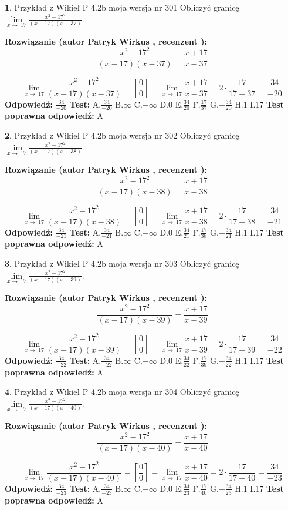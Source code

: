 \documentclass[12pt, a4paper]{article}
\theoremstyle{definition} %
\newtheorem{zad}{}
\newcommand{\zadStart}[1]{\begin{zad}#1\newline}
\newcommand{\zadStop}{\end{zad}}
\newcommand{\rozwStart}[2]{\noindent \textbf{Rozwiązanie (autor #1 , recenzent #2): }\newline}
\newcommand{\rozwStop}{\newline}
\newcommand{\odpStart}{\noindent \textbf{Odpowiedź:}\newline}
\newcommand{\odpStop}{\newline}
\newcommand{\testStart}{\noindent \textbf{Test:}\newline}
\newcommand{\testStop}{\newline}
\newcommand{\kluczStart}{\noindent \textbf{Test poprawna odpowiedź:}\newline}
\newcommand{\kluczStop}{\newline}
\begin{document}
\zadStart{Przykład z Wikieł P 4.2b moja wersja nr 301}
Obliczyć granicę $\lim\limits_{x\to\ 17}\frac{x^{2}-17^{2}}{(x-17)(x-37)}$.
\zadStop
\rozwStart{Patryk Wirkus}{}
$$\frac{x^{2}-17^{2}}{(x-17)(x-37)}=\frac{x+17}{x-37}$$

$$\lim\limits_{x\to\ 17}\frac{x^{2}-17^{2}}{(x-17)(x-37)}=[\frac{0}{0}]=\lim\limits_{x\to\ 17}\frac{x+17}{x-37}=2 \cdot \frac{17}{17-37} = \frac{34}{-20}$$
\rozwStop
\odpStart
$\frac{34}{-20}$
\odpStop
\testStart
A.$\frac{34}{-20}$
B.$\infty$
C.$-\infty$
D.$0$
E.$\frac{34}{20}$
F.$\frac{17}{37}$
G.$-\frac{34}{20}$
H.$1$
I.$17$
\testStop
\kluczStart
A
\kluczStop



\zadStart{Przykład z Wikieł P 4.2b moja wersja nr 302}
Obliczyć granicę $\lim\limits_{x\to\ 17}\frac{x^{2}-17^{2}}{(x-17)(x-38)}$.
\zadStop
\rozwStart{Patryk Wirkus}{}
$$\frac{x^{2}-17^{2}}{(x-17)(x-38)}=\frac{x+17}{x-38}$$

$$\lim\limits_{x\to\ 17}\frac{x^{2}-17^{2}}{(x-17)(x-38)}=[\frac{0}{0}]=\lim\limits_{x\to\ 17}\frac{x+17}{x-38}=2 \cdot \frac{17}{17-38} = \frac{34}{-21}$$
\rozwStop
\odpStart
$\frac{34}{-21}$
\odpStop
\testStart
A.$\frac{34}{-21}$
B.$\infty$
C.$-\infty$
D.$0$
E.$\frac{34}{21}$
F.$\frac{17}{38}$
G.$-\frac{34}{21}$
H.$1$
I.$17$
\testStop
\kluczStart
A
\kluczStop



\zadStart{Przykład z Wikieł P 4.2b moja wersja nr 303}
Obliczyć granicę $\lim\limits_{x\to\ 17}\frac{x^{2}-17^{2}}{(x-17)(x-39)}$.
\zadStop
\rozwStart{Patryk Wirkus}{}
$$\frac{x^{2}-17^{2}}{(x-17)(x-39)}=\frac{x+17}{x-39}$$

$$\lim\limits_{x\to\ 17}\frac{x^{2}-17^{2}}{(x-17)(x-39)}=[\frac{0}{0}]=\lim\limits_{x\to\ 17}\frac{x+17}{x-39}=2 \cdot \frac{17}{17-39} = \frac{34}{-22}$$
\rozwStop
\odpStart
$\frac{34}{-22}$
\odpStop
\testStart
A.$\frac{34}{-22}$
B.$\infty$
C.$-\infty$
D.$0$
E.$\frac{34}{22}$
F.$\frac{17}{39}$
G.$-\frac{34}{22}$
H.$1$
I.$17$
\testStop
\kluczStart
A
\kluczStop



\zadStart{Przykład z Wikieł P 4.2b moja wersja nr 304}
Obliczyć granicę $\lim\limits_{x\to\ 17}\frac{x^{2}-17^{2}}{(x-17)(x-40)}$.
\zadStop
\rozwStart{Patryk Wirkus}{}
$$\frac{x^{2}-17^{2}}{(x-17)(x-40)}=\frac{x+17}{x-40}$$

$$\lim\limits_{x\to\ 17}\frac{x^{2}-17^{2}}{(x-17)(x-40)}=[\frac{0}{0}]=\lim\limits_{x\to\ 17}\frac{x+17}{x-40}=2 \cdot \frac{17}{17-40} = \frac{34}{-23}$$
\rozwStop
\odpStart
$\frac{34}{-23}$
\odpStop
\testStart
A.$\frac{34}{-23}$
B.$\infty$
C.$-\infty$
D.$0$
E.$\frac{34}{23}$
F.$\frac{17}{40}$
G.$-\frac{34}{23}$
H.$1$
I.$17$
\testStop
\kluczStart
A
\kluczStop
\end{document}
